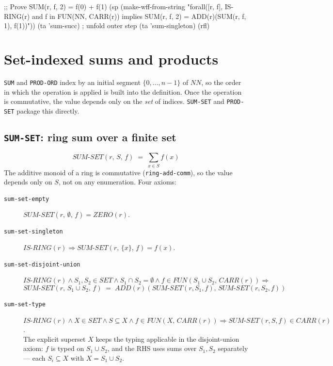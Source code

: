 \begin{VNBcode}
;; Prove SUM(r, f, 2) = f(0) + f(1)
(sp (make-wff-from-string
  "forall([r, f], IS-RING(r) and f in FUN(NN, CARR(r)) implies
     SUM(r, f, 2) = ADD(r)(SUM(r, f, 1), f(1))"))
(ta 'sum-succ)    ; unfold outer step
(ta 'sum-singleton)
(rfl)
\end{VNBcode}

\section{Set-indexed sums and products}
\label{sec:sum-set-prod-set}

\texttt{SUM} and \texttt{PROD-ORD} index by an initial segment
$\{0, \ldots, n-1\}$ of $\mathit{NN}$, so the order in which the
operation is applied is built into the definition.  Once the operation
is commutative, the value depends only on the \emph{set} of indices.
\texttt{SUM-SET} and \texttt{PROD-SET} package this directly.

\subsection{\texttt{SUM-SET}: ring sum over a finite set}
\label{sec:sum-set}

\[
   \mathit{SUM\text{-}SET}(r,\, S,\, f) \;=\; \sum_{x \in S} f(x)
\]
The additive monoid of a ring is commutative
(\texttt{ring-add-comm}), so the value depends only on $S$, not on any
enumeration.  Four axioms:
\begin{description}
\item[\texttt{sum-set-empty}]
  $\mathit{SUM\text{-}SET}(r,\, \emptyset,\, f) = \mathit{ZERO}(r)$.
\item[\texttt{sum-set-singleton}]
  $\mathit{IS\text{-}RING}(r) \Rightarrow
   \mathit{SUM\text{-}SET}(r,\, \{x\},\, f) = f(x)$.
\item[\texttt{sum-set-disjoint-union}]
  $\mathit{IS\text{-}RING}(r) \land S_1, S_2 \in \mathit{SET}
   \land S_1 \cap S_2 = \emptyset \land f \in \mathit{FUN}(S_1 \cup S_2,\, \mathit{CARR}(r))
   \Rightarrow$
  \[
    \mathit{SUM\text{-}SET}(r,\, S_1 \cup S_2,\, f)
    \;=\; \mathit{ADD}(r)(\mathit{SUM\text{-}SET}(r, S_1, f),\,
                          \mathit{SUM\text{-}SET}(r, S_2, f))
  \]
\item[\texttt{sum-set-type}]
  $\mathit{IS\text{-}RING}(r) \land X \in \mathit{SET}
   \land S \subseteq X \land f \in \mathit{FUN}(X,\, \mathit{CARR}(r))
   \Rightarrow \mathit{SUM\text{-}SET}(r, S, f) \in \mathit{CARR}(r)$.
  \\
  The explicit superset $X$ keeps the typing applicable in the
  disjoint-union axiom: $f$ is typed on $S_1 \cup S_2$, and the RHS
  uses sums over $S_1, S_2$ separately --- each $S_i \subseteq X$
  with $X = S_1 \cup S_2$.
\end{description}

